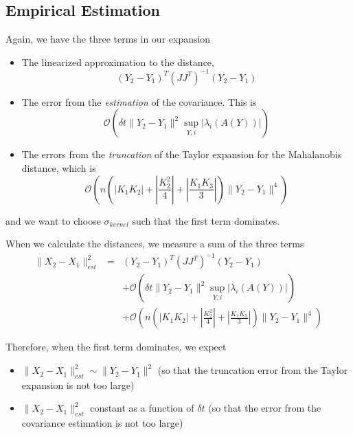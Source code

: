 \documentclass[12pt]{article}
\begin{document}
\subsection{Empirical Estimation}

Again, we have the three terms in our expansion
\begin{itemize}
\item The linearized approximation to the distance,
%
\begin{equation}
(Y_2 - Y_1)^T (JJ^T)^{-1} (Y_2 - Y_1) 
\end{equation}

\item The error from the {\em estimation} of the covariance.
%
This is
\begin{equation}
\mathcal{O} \left( \delta t \| Y_2 - Y_1 \|^2 \sup_{Y, i} |\lambda_i(A(Y))| \right) 
\end{equation}

\item The errors from the {\em truncation} of the Taylor expansion for the Mahalanobis distance, which is 
\begin{equation}
\mathcal{O} \left(  n \left( \left| K_1 K_2 \right| + \left| \frac{ K_2^2}{4} \right|  + \left| \frac{K_1 K_3}{3} \right|  \right) \| Y_2 - Y_1 \| ^4  \right) 
\end{equation}

\end{itemize}
and we want to choose $\sigma_{kernel}$ such that the first term dominates. 

When we calculate the distances, we measure a sum of the three terms
\begin{eqnarray}
\| X_2 - X_1 \|^2_{est} &=& 
(Y_2 - Y_1)^T (JJ^T)^{-1} (Y_2 - Y_1)  \\
&&
+ \mathcal{O} \left( \delta t \| Y_2 - Y_1 \|^2 \sup_{Y, i} |\lambda_i(A(Y))| \right) \\
&& + \mathcal{O} \left(  n \left( \left| K_1 K_2 \right| + \left| \frac{ K_2^2}{4} \right|  + \left| \frac{K_1 K_3}{3} \right|  \right) \| Y_2 - Y_1 \| ^4  \right) 
\end{eqnarray}

Therefore, when the first term dominates, we expect
\begin{itemize}
\item $\| X_2 - X_1 \|^2_{est} \sim \| Y_2 - Y_1 \|^2$ (so that the truncation error from the Taylor expansion is not too large)
\item $\| X_2 - X_1 \|^2_{est}$ constant as a function of $\delta t$ (so that the error from the covariance estimation is not too large)
\end{itemize}
\end{document}
